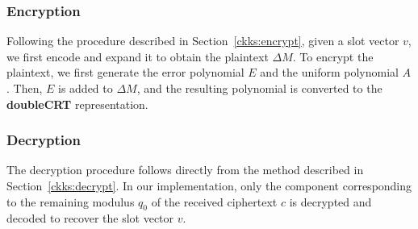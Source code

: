 \subsubsection{Encryption}

Following the procedure described in Section~\ref{ckks:encrypt}, given a slot vector $v$, we first encode and expand it to obtain the plaintext $\Delta M$. To encrypt the plaintext, we first generate the error polynomial \(E\) and the uniform polynomial \(A\). %
Then, \(E\) is added to \(\Delta M\), and the resulting polynomial is converted to the \textbf{doubleCRT} representation.


\subsubsection{Decryption}

The decryption procedure follows directly from the method described in Section~\ref{ckks:decrypt}. In our implementation, only the component corresponding to the remaining modulus \(q_0\) of the received ciphertext \(c\) is decrypted and decoded to recover the slot vector \(v\).

